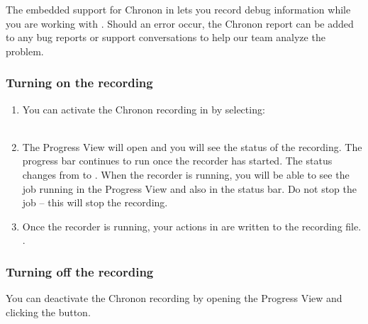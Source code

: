 
The embedded support for Chronon in \app{} lets you record debug information while you are working with \app{}. Should an error occur, the Chronon report can be added to any bug reports or support conversations to help our team analyze the problem. 

\subsubsection{Turning on the recording}
\begin{enumerate}
\item You can activate the Chronon recording in \app{} by selecting:\\
\\
\item The Progress View will open and you will see the status of the recording. The progress bar continues to run once the recorder has started. The status changes from  to . When the recorder is running, you will be able to see the job running in the Progress View and also in the status bar. Do not stop the job -- this will stop the recording. 
\item Once the recorder is running, your actions in \app{} are written to the recording file.
. 
\end{enumerate}

 
\subsubsection{Turning off the recording}
You can deactivate the Chronon recording by opening the Progress View and clicking the  button. 

